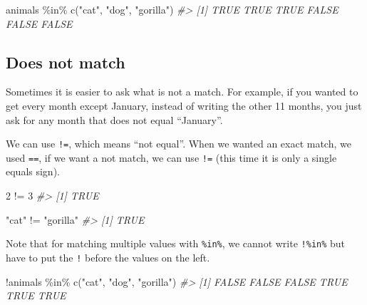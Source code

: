 \documentclass[
]{krantz}
\makeatletter
\newenvironment{Shaded}{\begin{snugshade}}{\end{snugshade}}
\newcommand{\CommentTok}[1]{\textcolor[rgb]{0.37,0.37,0.37}{\textit{#1}}}
\newcommand{\DecValTok}[1]{\textcolor[rgb]{0.06,0.06,0.06}{#1}}
\newcommand{\FunctionTok}[1]{\textcolor[rgb]{0,0,0}{#1}}
\newcommand{\NormalTok}[1]{#1}
\newcommand{\SpecialCharTok}[1]{\textcolor[rgb]{0,0,0}{#1}}
\newcommand{\StringTok}[1]{\textcolor[rgb]{0.5,0.5,0.5}{#1}}
\newenvironment{kframe}{%
\medskip{}
\setlength{\fboxsep}{.8em}
 \def\at@end@of@kframe{}%
 \ifinner\ifhmode%
  \def\at@end@of@kframe{\end{minipage}}%
  \begin{minipage}{\columnwidth}%
 \fi\fi%
 \def\FrameCommand##1{\hskip\@totalleftmargin \hskip-\fboxsep
 \colorbox{shadecolor}{##1}\hskip-\fboxsep
     \hskip-\linewidth \hskip-\@totalleftmargin \hskip\columnwidth}%
 \MakeFramed {\advance\hsize-\width
   \@totalleftmargin\z@ \linewidth\hsize
   \@setminipage}}%
 {\par\unskip\endMakeFramed%
 \at@end@of@kframe}
\renewenvironment{Shaded}{\begin{kframe}}{\end{kframe}}
\makeatother
\begin{document}
\begin{Shaded}
\begin{Highlighting}[]
\NormalTok{animals }\SpecialCharTok{\%in\%} \FunctionTok{c}\NormalTok{(}\StringTok{"cat"}\NormalTok{, }\StringTok{"dog"}\NormalTok{, }\StringTok{"gorilla"}\NormalTok{)}
\CommentTok{\#\textgreater{} [1]  TRUE  TRUE  TRUE FALSE FALSE FALSE}
\end{Highlighting}
\end{Shaded}

\hypertarget{does-not-match}{%
\subsection{Does not match}\label{does-not-match}}

Sometimes it is easier to ask what is not a match. For example, if you wanted to get every month except January, instead of writing the other 11 months, you just ask for any month that does not equal ``January''.

We can use \texttt{!=}, which means ``not equal''. When we wanted an exact match, we used \texttt{==}, if we want a not match, we can use \texttt{!=} (this time it is only a single equals sign).

\begin{Shaded}
\begin{Highlighting}[]
\DecValTok{2} \SpecialCharTok{!=} \DecValTok{3}
\CommentTok{\#\textgreater{} [1] TRUE}
\end{Highlighting}
\end{Shaded}

\begin{Shaded}
\begin{Highlighting}[]
\StringTok{"cat"} \SpecialCharTok{!=} \StringTok{"gorilla"}
\CommentTok{\#\textgreater{} [1] TRUE}
\end{Highlighting}
\end{Shaded}

Note that for matching multiple values with \texttt{\%in\%}, we cannot write \texttt{!\%in\%} but have to put the \texttt{!} before the values on the left.

\begin{Shaded}
\begin{Highlighting}[]
\SpecialCharTok{!}\NormalTok{animals }\SpecialCharTok{\%in\%} \FunctionTok{c}\NormalTok{(}\StringTok{"cat"}\NormalTok{, }\StringTok{"dog"}\NormalTok{, }\StringTok{"gorilla"}\NormalTok{)}
\CommentTok{\#\textgreater{} [1] FALSE FALSE FALSE  TRUE  TRUE  TRUE}
\end{Highlighting}
\end{Shaded}
\end{document}
